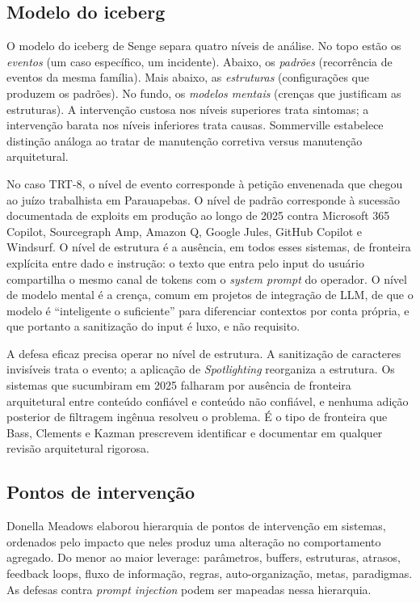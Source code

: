\documentclass[11pt,a4paper]{article}
\begin{document}
\subsection{Modelo do iceberg}

O modelo do iceberg de Senge \cite{senge1990} separa quatro níveis de análise. No topo estão os \emph{eventos} (um caso específico, um incidente). Abaixo, os \emph{padrões} (recorrência de eventos da mesma família). Mais abaixo, as \emph{estruturas} (configurações que produzem os padrões). No fundo, os \emph{modelos mentais} (crenças que justificam as estruturas). A intervenção custosa nos níveis superiores trata sintomas; a intervenção barata nos níveis inferiores trata causas. Sommerville \cite{sommerville2016} estabelece distinção análoga ao tratar de manutenção corretiva versus manutenção arquitetural.

No caso TRT-8, o nível de evento corresponde à petição envenenada que chegou ao juízo trabalhista em Parauapebas. O nível de padrão corresponde à sucessão documentada de exploits em produção ao longo de 2025 contra Microsoft 365 Copilot, Sourcegraph Amp, Amazon Q, Google Jules, GitHub Copilot e Windsurf. O nível de estrutura é a ausência, em todos esses sistemas, de fronteira explícita entre dado e instrução: o texto que entra pelo input do usuário compartilha o mesmo canal de tokens com o \emph{system prompt} do operador. O nível de modelo mental é a crença, comum em projetos de integração de LLM, de que o modelo é \enquote{inteligente o suficiente} para diferenciar contextos por conta própria, e que portanto a sanitização do input é luxo, e não requisito.

A defesa eficaz precisa operar no nível de estrutura. A sanitização de caracteres invisíveis trata o evento; a aplicação de \emph{Spotlighting} reorganiza a estrutura. Os sistemas que sucumbiram em 2025 falharam por ausência de fronteira arquitetural entre conteúdo confiável e conteúdo não confiável, e nenhuma adição posterior de filtragem ingênua resolveu o problema. É o tipo de fronteira que Bass, Clements e Kazman \cite{bass2012} prescrevem identificar e documentar em qualquer revisão arquitetural rigorosa.

\subsection{Pontos de intervenção}

Donella Meadows \cite{meadows2008} elaborou hierarquia de pontos de intervenção em sistemas, ordenados pelo impacto que neles produz uma alteração no comportamento agregado. Do menor ao maior leverage: parâmetros, buffers, estruturas, atrasos, feedback loops, fluxo de informação, regras, auto-organização, metas, paradigmas. As defesas contra \emph{prompt injection} podem ser mapeadas nessa hierarquia.
\end{document}
